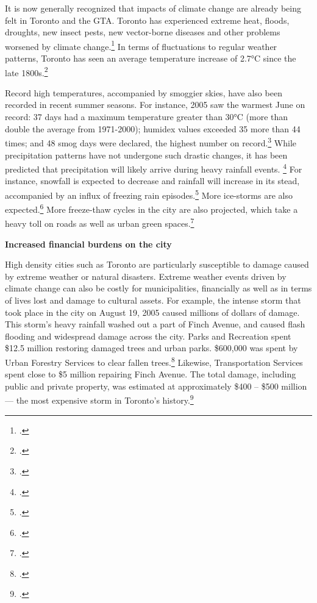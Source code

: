 It is now generally recognized that impacts of climate change are already being felt in Toronto and the GTA.
Toronto has experienced extreme heat, floods, droughts, new insect pests, new vector-borne diseases and other problems worsened by climate change.\footcite[][]{TorontoAheadStorm}
In terms of fluctuations to regular weather patterns, Toronto has seen an average temperature increase of 2.7°C since the late 1800s.\footcite[][p. 5]{ScanCCToronto}



Record high temperatures, accompanied by smoggier skies, have also been recorded in recent summer seasons. 
For instance, 2005 saw the warmest June on record: 37 days had a maximum temperature greater than 30°C (more than double the average from 1971-2000); humidex values exceeded 35 more than 44 times; and 48 smog days were declared, the highest number on record.\footcite[][p. iii, p. 7]{ScanCCToronto}
While precipitation patterns have not undergone such drastic changes, it has been predicted that precipitation will likely arrive during heavy rainfall events. \footcite[][p. 6]{ScanCCToronto}
For instance, snowfall is expected to decrease and rainfall will increase in its stead, accompanied by an influx of freezing rain episodes.\footcite[][p. 8]{TorontoAheadStorm}
More ice-storms are also expected.\footcite[][]{FreezingRain2007}
More freeze-thaw cycles in the city are also projected, which take a heavy toll on roads as well as urban green spaces.\footcite[][p. 8]{TorontoAheadStorm}



\textbf{Increased financial burdens on the city}



High density cities such as Toronto are particularly susceptible to damage caused by extreme weather or natural disasters. 
Extreme weather events driven by climate change can also be costly for municipalities, financially as well as in terms of lives lost and damage to cultural assets. 
For example, the intense storm that took place in the city on August 19, 2005 caused millions of dollars of damage. 
This storm's heavy rainfall washed out a part of Finch Avenue, and caused flash flooding and widespread damage across the city. 
Parks and Recreation spent \$12.5 million restoring damaged trees and urban parks. 
\$600,000 was spent by Urban Forestry Services to clear fallen trees.\footcite[][p. iii]{ScanCCToronto}
Likewise, Transportation Services spent close to \$5 million repairing Finch Avenue. 
The total damage, including public and private property, was estimated at approximately \$400 -- \$500 million --- the most expensive storm in Toronto's history.\footcite[][p. 11]{TorontoAheadStorm}



